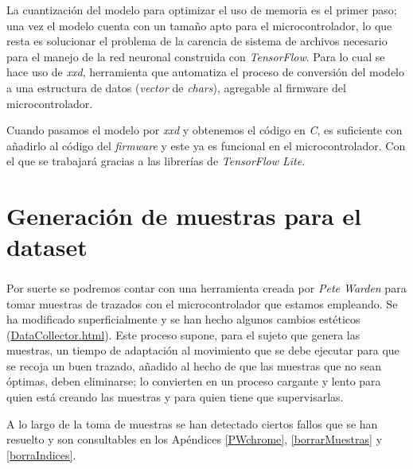 La cuantización del modelo para optimizar el uso de memoria es el primer
paso; una vez el modelo cuenta con un tamaño apto para el microcontrolador,
lo que resta es solucionar el problema de la carencia de sistema de archivos
necesario para el manejo de la red neuronal construida con \textit{TensorFlow}.
Para lo cual se hace uso de \textit{xxd}, herramienta que automatiza el proceso
de conversión del modelo a una estructura de datos (\textit{vector} de
\textit{chars}), agregable al firmware del microcontrolador.

Cuando pasamos el modelo por \textit{xxd} y obtenemos el código en \textit{C},
es suficiente con añadirlo al código del \textit{firmware} y este ya es funcional
en el microcontrolador. Con el que se trabajará gracias a las librerías de
\textit{TensorFlow Lite}.

\section{Generación de muestras para el dataset\label{dataColl}}
Por suerte se podremos contar con una herramienta creada por
\textit{Pete Warden}\textsuperscript{\cite{petewardenmw}} para tomar
muestras de trazados con el microcontrolador que estamos empleando.
Se ha modificado superficialmente y se han hecho algunos cambios
estéticos (\href{https://github.com/AntonioPriego/SmartPen/blob/main/DataCollector/SmartPen_DataCollector.html}{DataCollector.html}). 
Este proceso supone, para el sujeto que genera las muestras, un tiempo de
adaptación al movimiento que se debe ejecutar para que se recoja un buen trazado,
añadido al hecho de que las muestras que no sean óptimas, deben eliminarse;
lo convierten en un proceso cargante y lento para quien está creando las muestras
y para quien tiene que supervisarlas.

A lo largo de la toma de muestras se han detectado ciertos fallos que
se han resuelto y son consultables en los Apéndices \ref{PWchrome},
\ref{borrarMuestras} y \ref{borraIndices}.